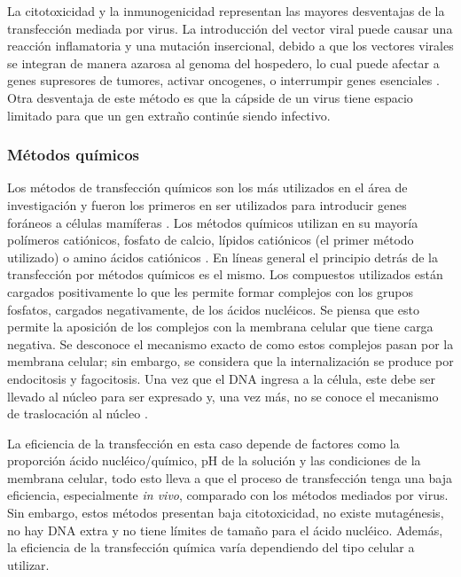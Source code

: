 \documentclass[fleqn,10pt]{SelfArx} %
\begin{document}
La citotoxicidad y la inmunogenicidad representan las mayores desventajas de la transfección mediada por virus. La introducción del vector viral puede causar una reacción inflamatoria y una mutación insercional, debido a que los vectores virales se integran de manera azarosa al genoma del hospedero, lo cual puede afectar a genes supresores de tumores, activar oncogenes, o interrumpir genes esenciales \cite{Woods:2003aa}. Otra desventaja de este método es que la cápside de un virus tiene espacio limitado para que un gen extraño continúe siendo infectivo. 

\subsubsection{Métodos químicos}
Los métodos de transfección químicos son los más utilizados en el área de investigación y fueron los primeros en ser utilizados para introducir genes foráneos a células mamíferas \cite{Schenborn2000}. Los métodos químicos utilizan en su mayoría polímeros catiónicos, fosfato de calcio, lípidos catiónicos (el primer método utilizado) o amino ácidos catiónicos \cite{Schenborn2000, Holmen:1995aa, Washbourne:2002aa}. En líneas general el principio detrás de la transfección por métodos químicos es el mismo. Los compuestos utilizados están cargados positivamente lo que les permite formar complejos con los grupos fosfatos, cargados negativamente, de los ácidos nucléicos. Se piensa que esto permite la aposición de los complejos con la membrana celular que tiene carga negativa. Se desconoce el mecanismo exacto de como estos complejos pasan por la membrana celular; sin embargo, se considera que la internalización se produce por endocitosis y fagocitosis. Una vez que el DNA ingresa a la célula, este debe ser llevado al núcleo para ser expresado y, una vez más, no se conoce el mecanismo de traslocación al núcleo \cite{Kim:2010aa}. 

La eficiencia de la transfección en esta caso depende de factores como la proporción ácido nucléico/químico, pH de la solución y las condiciones de la membrana celular, todo esto lleva a que el proceso de transfección tenga una baja eficiencia, especialmente \textit{in vivo}, comparado con los métodos mediados por virus. Sin embargo, estos métodos presentan baja citotoxicidad, no existe mutagénesis, no hay DNA extra y no tiene límites de tamaño para el ácido nucléico. Además, la eficiencia de la transfección química varía dependiendo del tipo celular a utilizar.
\end{document}
